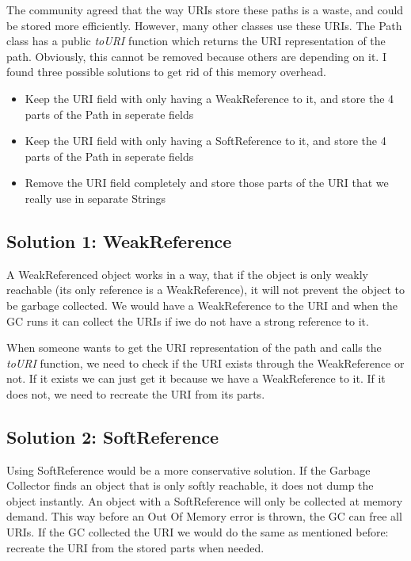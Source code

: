 The community agreed that the way URIs store these paths is a waste, and could be stored more efficiently. However, many other classes use these URIs. The Path class has a public \textit{toURI} function which returns the URI representation of the path. Obviously, this cannot be removed because others are depending on it. I found three possible solutions to get rid of this memory overhead.

\begin{itemize}
	\item Keep the URI field with only having a WeakReference to it, and store the 4 parts of the Path in seperate fields
	\item Keep the URI field with only having a SoftReference to it, and store the 4 parts of the Path in seperate fields
	\item Remove the URI field completely and store those parts of the URI that we really use in separate Strings
\end{itemize}

\subsection{Solution 1: WeakReference}
A WeakReferenced object works in a way, that if the object is only weakly reachable (its only reference is a WeakReference), it will not prevent the object to be garbage collected. We would have a WeakReference to the URI and when the GC runs it can collect the URIs if iwe do not have a strong reference to it. 

When someone wants to get the URI representation of the path and calls the \textit{toURI} function, we need to check if the URI exists through the WeakReference or not. If it exists we can just get it because we have a WeakReference to it. If it does not, we need to recreate the URI from its parts. 

\subsection{Solution 2: SoftReference}
Using SoftReference would be a more conservative solution. If the Garbage Collector finds an object that is only softly reachable, it does not dump the object instantly. An object with a SoftReference will only be collected at memory demand. This way before an Out Of Memory error is thrown, the GC can free all URIs. If the GC collected the URI we would do the same as mentioned before: recreate the URI from the stored parts when needed. 

